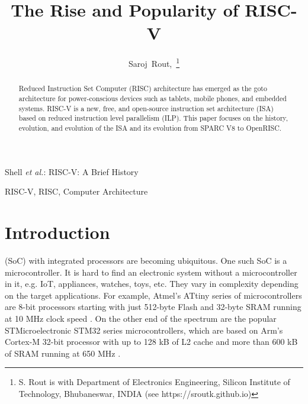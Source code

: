 \documentclass[journal]{IEEEtran}
\begin{document}
%
\title{The Rise and Popularity of RISC-V}
%
\author{Saroj~Rout,~\thanks{S. Rout is with Department of Electronics Engineering, Silicon Institute of Technology, Bhubaneswar, INDIA (see https://sroutk.github.io)} }%

%
{Shell \MakeLowercase{\textit{et al.}}: RISC-V: A Brief History}

\maketitle

\begin{abstract}
Reduced Instruction Set Computer (RISC) architecture has emerged as the goto architecture for power-conscious devices such as tablets, mobile phones, and embedded systems. RISC-V is a new, free, and open-source instruction set architecture (ISA) based on reduced instruction level parallelism (ILP). This paper focuses on the history, evolution, and evolution of the ISA and its evolution from SPARC V8 to OpenRISC.
\end{abstract}



\begin{IEEEkeywords}
RISC-V, RISC, Computer Architecture
\end{IEEEkeywords}

\section{Introduction}

 (SoC) with integrated processors are becoming ubiquitous. One such SoC is a microcontroller. It is hard to find an electronic system without a microcontroller in it, e.g. IoT, appliances, watches, toys, etc. They vary in complexity depending on the target applications. For example, Atmel's ATtiny series of microcontrollers are 8-bit processors starting with just 512-byte Flash and 32-byte SRAM running at 10 MHz clock speed \cite{microchip_attiny85_nodate}. On the other end of the spectrum are the popular STMicroelectronic STM32 series microcontrollers, which are based on Arm's Cortex-M 32-bit processor with up to 128 kB of L2 cache and more than 600 kB of SRAM running at 650 MHz \cite{stmicroelectronics_stm32_nodate}.
\end{document}
